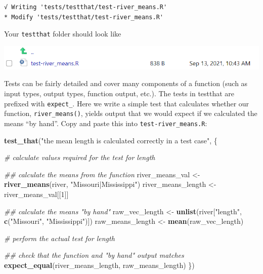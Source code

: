 \documentclass[
]{book}
\newenvironment{Shaded}{\begin{snugshade}}{\end{snugshade}}
\newcommand{\CommentTok}[1]{\textcolor[rgb]{0.56,0.35,0.01}{\textit{#1}}}
\newcommand{\DecValTok}[1]{\textcolor[rgb]{0.00,0.00,0.81}{#1}}
\newcommand{\KeywordTok}[1]{\textcolor[rgb]{0.13,0.29,0.53}{\textbf{#1}}}
\newcommand{\NormalTok}[1]{#1}
\newcommand{\StringTok}[1]{\textcolor[rgb]{0.31,0.60,0.02}{#1}}
\begin{document}
\begin{verbatim}
√ Writing 'tests/testthat/test-river_means.R'
* Modify 'tests/testthat/test-river_means.R'
\end{verbatim}

Your \texttt{testthat} folder should look like

\includegraphics[width=1\linewidth]{images/newrpack_files5}

Tests can be fairly detailed and cover many components of a function (such as input types, output types, function output, etc.). The tests in testthat are prefixed with \texttt{expect\_}. Here we write a simple test that calculates whether our function, \texttt{river\_means()}, yields output that we would expect if we calculated the means ``by hand''. Copy and paste this into \texttt{test-river\_means.R}:

\begin{Shaded}
\begin{Highlighting}[]
\KeywordTok{test_that}\NormalTok{(}\StringTok{"the mean length is calculated correctly in a test case"}\NormalTok{, \{}
  
  \CommentTok{# calculate values required for the test for length}

  \CommentTok{## calculate the means from the function}
\NormalTok{  river_means_val <-}\StringTok{ }\KeywordTok{river_means}\NormalTok{(river, }\StringTok{"Missouri|Mississippi"}\NormalTok{)}
\NormalTok{  river_means_length <-}\StringTok{ }\NormalTok{river_means_val[[}\DecValTok{1}\NormalTok{]]}

  \CommentTok{## calculate the means "by hand"}
\NormalTok{  raw_vec_length <-}\StringTok{ }\KeywordTok{unlist}\NormalTok{(river[}\StringTok{"length"}\NormalTok{, }\KeywordTok{c}\NormalTok{(}\StringTok{"Missouri"}\NormalTok{, }\StringTok{"Mississippi"}\NormalTok{)])}
\NormalTok{  raw_means_length <-}\StringTok{ }\KeywordTok{mean}\NormalTok{(raw_vec_length)}
  
  \CommentTok{# perform the actual test for length}

  \CommentTok{## check that the function and "by hand" output matches}
  \KeywordTok{expect_equal}\NormalTok{(river_means_length, raw_means_length)}
\NormalTok{\})}
\end{Highlighting}
\end{Shaded}
\end{document}
